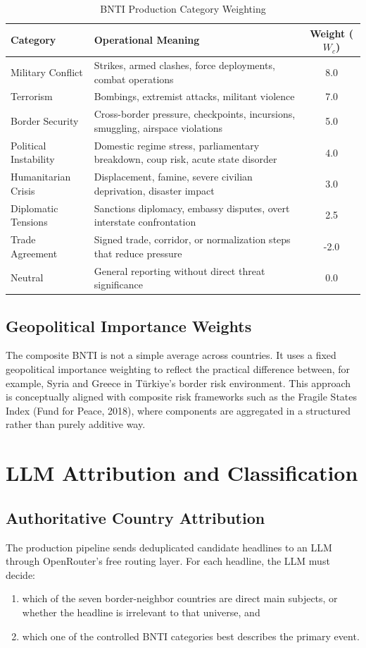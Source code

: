 \documentclass[11pt, a4paper]{article}
\begin{document}
\begin{table}[h]
\centering
\caption{BNTI Production Category Weighting}
\label{tab:weights}
\begin{tabular}{@{}llc@{}}
\toprule
\textbf{Category} & \textbf{Operational Meaning} & \textbf{Weight ($W_c$)} \\ \midrule
Military Conflict & Strikes, armed clashes, force deployments, combat operations & 8.0 \\
Terrorism & Bombings, extremist attacks, militant violence & 7.0 \\
Border Security & Cross-border pressure, checkpoints, incursions, smuggling, airspace violations & 5.0 \\
Political Instability & Domestic regime stress, parliamentary breakdown, coup risk, acute state disorder & 4.0 \\
Humanitarian Crisis & Displacement, famine, severe civilian deprivation, disaster impact & 3.0 \\
Diplomatic Tensions & Sanctions diplomacy, embassy disputes, overt interstate confrontation & 2.5 \\
Trade Agreement & Signed trade, corridor, or normalization steps that reduce pressure & -2.0 \\
Neutral & General reporting without direct threat significance & 0.0 \\ \bottomrule
\end{tabular}
\end{table}

\subsection{Geopolitical Importance Weights}
The composite BNTI is not a simple average across countries. It uses a fixed geopolitical importance weighting to reflect the practical difference between, for example, Syria and Greece in Türkiye's border risk environment. This approach is conceptually aligned with composite risk frameworks such as the Fragile States Index (Fund for Peace, 2018), where components are aggregated in a structured rather than purely additive way.

\section{LLM Attribution and Classification}

\subsection{Authoritative Country Attribution}
The production pipeline sends deduplicated candidate headlines to an LLM through OpenRouter's free routing layer. For each headline, the LLM must decide:
\begin{enumerate}
    \item which of the seven border-neighbor countries are direct main subjects, or whether the headline is irrelevant to that universe, and
    \item which one of the controlled BNTI categories best describes the primary event.
\end{enumerate}
\end{document}
